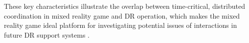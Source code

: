 These key characteristics illustrate the overlap between time-critical, distributed coordination in mixed reality game and DR operation, which makes the mixed reality game ideal platform for investigating potential issues of interactions in future DR support systems \cite{Fischer2012}.\\






